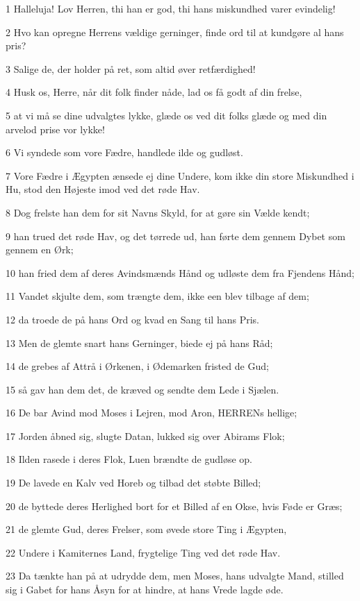 \par 1 Halleluja! Lov Herren, thi han er god, thi hans miskundhed varer evindelig!
\par 2 Hvo kan opregne Herrens vældige gerninger, finde ord til at kundgøre al hans pris?
\par 3 Salige de, der holder på ret, som altid øver retfærdighed!
\par 4 Husk os, Herre, når dit folk finder nåde, lad os få godt af din frelse,
\par 5 at vi må se dine udvalgtes lykke, glæde os ved dit folks glæde og med din arvelod prise vor lykke!
\par 6 Vi syndede som vore Fædre, handlede ilde og gudløst.
\par 7 Vore Fædre i Ægypten ænsede ej dine Undere, kom ikke din store Miskundhed i Hu, stod den Højeste imod ved det røde Hav.
\par 8 Dog frelste han dem for sit Navns Skyld, for at gøre sin Vælde kendt;
\par 9 han trued det røde Hav, og det tørrede ud, han førte dem gennem Dybet som gennem en Ørk;
\par 10 han fried dem af deres Avindsmænds Hånd og udløste dem fra Fjendens Hånd;
\par 11 Vandet skjulte dem, som trængte dem, ikke een blev tilbage af dem;
\par 12 da troede de på hans Ord og kvad en Sang til hans Pris.
\par 13 Men de glemte snart hans Gerninger, biede ej på hans Råd;
\par 14 de grebes af Attrå i Ørkenen, i Ødemarken fristed de Gud;
\par 15 så gav han dem det, de kræved og sendte dem Lede i Sjælen.
\par 16 De bar Avind mod Moses i Lejren, mod Aron, HERRENs hellige;
\par 17 Jorden åbned sig, slugte Datan, lukked sig over Abirams Flok;
\par 18 Ilden rasede i deres Flok, Luen brændte de gudløse op.
\par 19 De lavede en Kalv ved Horeb og tilbad det støbte Billed;
\par 20 de byttede deres Herlighed bort for et Billed af en Okse, hvis Føde er Græs;
\par 21 de glemte Gud, deres Frelser, som øvede store Ting i Ægypten,
\par 22 Undere i Kamiternes Land, frygtelige Ting ved det røde Hav.
\par 23 Da tænkte han på at udrydde dem, men Moses, hans udvalgte Mand, stilled sig i Gabet for hans Åsyn for at hindre, at hans Vrede lagde øde.

